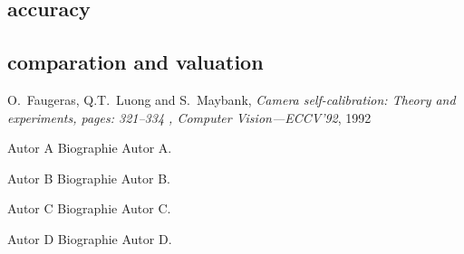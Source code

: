 \documentclass[journal,final,a4paper,twoside]{PS}
\begin{document}
\subsection{accuracy}
\subsection{comparation and valuation}


\newpage

\begin{thebibliography}{1}
O.~Faugeras, Q.T.~Luong and S.~Maybank, \emph{{Camera self-calibration: Theory and experiments}, {pages: 321--334} , {Computer Vision---ECCV'92}}, 1992

\end{thebibliography}

\begin{biography}
{Autor A}
Biographie Autor A.
\end{biography}
\begin{biography}
{Autor B}
Biographie Autor B.
\end{biography}
\begin{biography}
{Autor C}
Biographie Autor C.

\end{biography}

\begin{biography}
{Autor D}
Biographie Autor D.

\end{biography}
\end{document}
